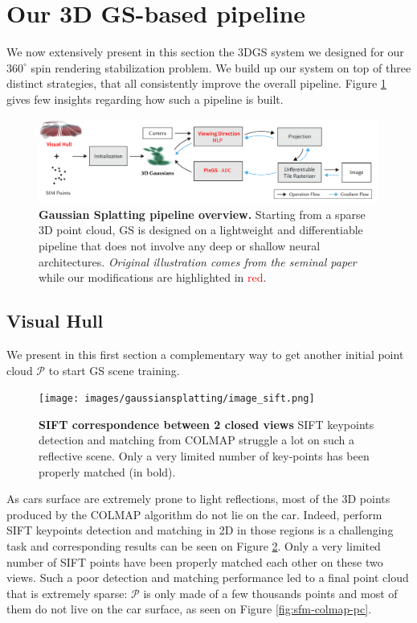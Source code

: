 \section{Our 3D GS-based pipeline}
We now extensively present in this section the 3D\ac{GS} system we designed for our $360^{\circ}$ spin rendering stabilization problem. We build up our system on top of three distinct strategies, that all consistently improve the overall pipeline. Figure \ref{fig:gs-overview} gives few insights regarding how such a pipeline is built. \newline

\begin{figure}[htb!]
    \center
  \includegraphics[width=\linewidth]{images/gaussiansplatting/overview_pipeline.png}
  \caption{\textbf{Gaussian Splatting pipeline overview.} Starting from a sparse 3D point cloud, GS is designed on a lightweight and differentiable pipeline that does not involve any deep or shallow neural architectures. \textit{Original illustration comes from the seminal paper}\citep{kerbl20233d} while our modifications are highlighted in \textcolor{red}{red}.}
  \label{fig:gs-overview}
\end{figure}

\subsection{Visual Hull}

We present in this first section a complementary way to get another initial point cloud $\mathcal{P}$ to start GS scene training. 

\begin{figure}[htbp!]
    \center
  \texttt{[image: images/gaussiansplatting/image\_sift.png]}
  \caption{\textbf{SIFT correspondence between 2 closed views} SIFT keypoints detection and matching from COLMAP struggle a lot on such a reflective scene. Only a very limited number of key-points has been properly matched (in bold).}
  \label{fig:sift-colmap}
\end{figure}

As cars surface are extremely prone to light reflections, most of the 3D points produced by the COLMAP algorithm do not lie on the car. Indeed, perform SIFT keypoints detection and matching in 2D in those regions is a challenging task and corresponding results can be seen on Figure \ref{fig:sift-colmap}. Only a very limited number of SIFT points have been properly matched each other on these two views. Such a poor detection and matching performance led to a 
final point cloud that is extremely sparse: $\mathcal{P}$ is only made of a few thousands points and most of them do not live on the car surface, as seen on Figure \ref{fig:sfm-colmap-pc}. 

